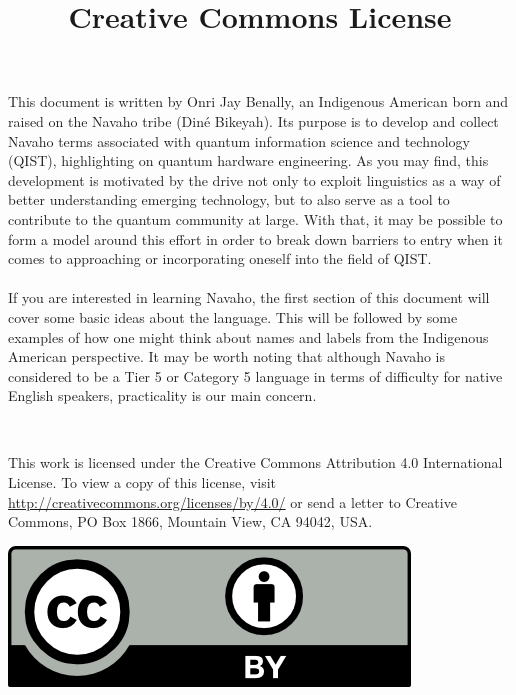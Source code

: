 \large{This document is written by Onri Jay Benally, an Indigenous American born and raised on the Navaho tribe (Diné Bikeyah). Its purpose is to develop and collect Navaho terms associated with quantum information science and technology (QIST), highlighting on quantum hardware engineering. As you may find, this development is motivated by the drive not only to exploit linguistics as a way of better understanding emerging technology, but to also serve as a tool to contribute to the quantum community at large. With that, it may be possible to form a model around this effort in order to break down barriers to entry when it comes to approaching or incorporating oneself into the field of QIST. 
\\ 
\space
\\
\indent If you are interested in learning Navaho, the first section of this document will cover some basic ideas about the language. This will be followed by some examples of how one might think about names and labels from the Indigenous American perspective. It may be worth noting that although Navaho is considered to be a Tier 5 or Category 5 language in terms of difficulty for native English speakers, practicality is our main concern.
}


\begin{center}
\space
\end{center}


\begin{flushleft}
\title{\Large\textbf{Creative Commons License}}\\
\end{flushleft}

{
\large This work is licensed under the Creative Commons Attribution 4.0 International License. To view a copy of this license, visit \url{http://creativecommons.org/licenses/by/4.0/} or send a letter to Creative Commons, PO Box 1866, Mountain View, CA 94042, USA.
}

\begin{center}

\includegraphics{by.png}

\end{center}